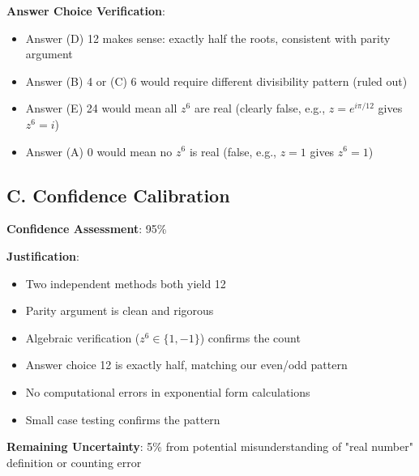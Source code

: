 \documentclass[]{article}
\begin{document}
\begin{verificationbox}
\textbf{Answer Choice Verification}:
\begin{itemize}[leftmargin=*]
    \item Answer (D) 12 makes sense: exactly half the roots, consistent with parity argument
    \item Answer (B) 4 or (C) 6 would require different divisibility pattern (ruled out)
    \item Answer (E) 24 would mean all $z^6$ are real (clearly false, e.g., $z = e^{i\pi/12}$ gives $z^6 = i$)
    \item Answer (A) 0 would mean no $z^6$ is real (false, e.g., $z=1$ gives $z^6=1$)
\end{itemize}

\subsection*{C. Confidence Calibration}

\textbf{Confidence Assessment}: 95\%

\textbf{Justification}:
\begin{itemize}[leftmargin=*]
    \item Two independent methods both yield 12
    \item Parity argument is clean and rigorous
    \item Algebraic verification ($z^6 \in \{1, -1\}$) confirms the count
    \item Answer choice 12 is exactly half, matching our even/odd pattern
    \item No computational errors in exponential form calculations
    \item Small case testing confirms the pattern
\end{itemize}

\textbf{Remaining Uncertainty}: 5\% from potential misunderstanding of "real number" definition or counting error
\end{verificationbox}
\end{document}
